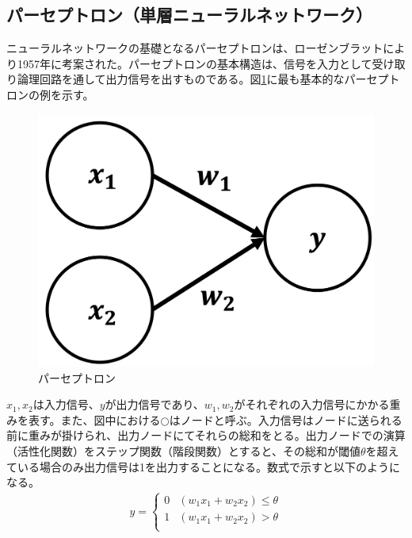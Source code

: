\subsection{パーセプトロン（単層ニューラルネットワーク）}
ニューラルネットワークの基礎となるパーセプトロンは、ローゼンブラットにより1957年に考案された\cite{perceptron}。パーセプトロンの基本構造は、信号を入力として受け取り論理回路を通して出力信号を出すものである。図\ref{perceptron}に最も基本的なパーセプトロンの例\cite{dnnbook}を示す。
\begin{figure}[H]
	\begin{center}
 \includegraphics[keepaspectratio, scale=0.15]
 	{Figure/Deeplearning/perceptron.png}
 		\caption{パーセプトロン\cite{dnnbook}}
 		\label{perceptron}
	\end{center}
\end{figure}
$x_1, x_2$は入力信号、$y$が出力信号であり、$w_1,w_2$がそれぞれの入力信号にかかる重みを表す。また、図中における$\bigcirc$はノードと呼ぶ。入力信号はノードに送られる前に重みが掛けられ、出力ノードにてそれらの総和をとる。出力ノードでの演算（活性化関数）をステップ関数（階段関数）とすると、その総和が閾値$\theta$を超えている場合のみ出力信号は1を出力することになる。数式で示すと以下のようになる。
\begin{align}
 y =
 \begin{cases}
 0 & (w_1x_1 + w_2x_2 ) \leq \theta\\
 1 & (w_1x_1 + w_2x_2 ) > \theta \\
 \end{cases}
\end{align}

